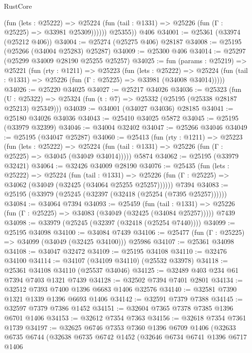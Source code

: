 \begin{lexlean}{RustCore}
\begin{coremodule}
              (fun (lets : @25222) =>
              @25224 (fun (tail : @1331) => @25226 (fun (Γ : @25225) => @33981 @25309))))))
        @25355))
    @406
@34001 := @25361 (@33974 (@25212 @406))
@34004 := @25274 (@25275 @406) @28187
@34008 := @25195 (@25266 (@34004 @25283) @25287)
@34009 := @25300 @406
@34014 := @25297 (@25299 @34009 @28190 @25255 @25257)
@34025 := fun (params : @25219) =>
  @25221
    (fun (rty : @1211) =>
    @25223
      (fun (lets : @25222) =>
      @25224 (fun (tail : @1331) => @25226 (fun (Γ : @25225) => @33981 (@34008 @34014)))))
@34026 := @25220 @34025
@34027 := @25217 @34026
@34036 := @25323
    (fun (U : @25322) => @25324 (fun (t : @7) => @25332 (@25195 (@25338 @28187 @25213) @25349)))
@34039 := @34001 (@34027 @34036) @28185
@34041 := @25180 @34026 @34036
@34043 := @25410 @34025 @5872
@34045 := @25195 (@33979 @32399)
@34046 := @34004 @32402
@34047 := @25266 @34046
@34049 := @25195 (@34047 @25287)
@34060 := @25413
    (fun (rty : @1211) =>
    @25223
      (fun (lets : @25222) =>
      @25224 (fun (tail : @1331) => @25226 (fun (Γ : @25225) => @34045 (@34049 @34014)))))
    @5874
@34062 := @25195 (@33979 @32421)
@34064 := @32426 @34009 @28190
@34076 := @25435
    (fun (lets : @25222) =>
    @25224
      (fun (tail : @1331) =>
      @25226 (fun (Γ : @25225) => @34062 (@34049 (@32425 (@34064 @25255 @25257))))))
    @7394
@34083 := @25195 (@33979 (@25245 (@32397 (@32418 (@25254 (@7395 @25257))))))
@34084 := @34064 @7394
@34093 := @25459
    (fun (tail : @1331) => @25226 (fun (Γ : @25225) => @34083 (@34049 (@32425 (@34084 @25257)))))
    @7439
@34098 := @33979 (@25245 (@32397 (@32418 (@25254 @7440))))
@34099 := @25195 @34098
@34100 := @34084 @7439
@34106 := @25477 (fun (Γ : @25225) => @34099 (@34049 (@32425 @34100))) @25986
@34107 := @25361 @34098
@34108 := @34047 @32472
@34109 := @25195 @34108
@34110 := @32476 @34100
@34114 := @34107 (@34109 @34110) (@25532 @33978)
@34118 := @25361 @34108 @34110 (@25537 @34046)
@34125 := @32489 @403 @234 @61 @7394 @7403 @1321 @7439
@34128 := @32502 @7394 @7401 @2801
@34134 := @32512 @7393 @7400 @1396 @6683 @1406 @32576
@34140 := @32581 @7390 @1321 @1339 @1396 @6693 @1406
@34142 := @32591 @7379 @7388
@34145 := @32597 @7379 @7386 @1452
@34151 := @32604 @7365 @7378 @7385 @1396 @6701 @1406
@34153 := @32612 @7354 @7363
@34156 := @32618 @7354 @7361 @1739
@34197 := @32625
    @6746
    @7353
    @7360
    @1396
    @6709
    @1406
    (@32633
      @6735
      @6744
      (@32638
        @6735
        @6742
        @1452
        (@32646
          @6734
          @6741
          @1396
          @6717
          @1406

\end{coremodule}
\end{lexlean}
